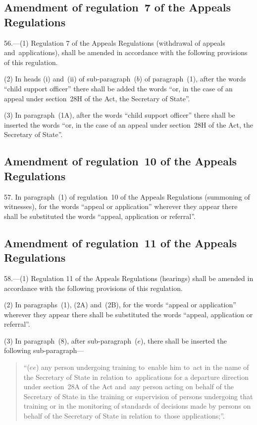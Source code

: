 \documentclass[12pt,a4paper]{article}
\begin{document}
\subsection[56. Amendment of regulation~7 of the Appeals Regulations]{Amendment of regulation~7 of the Appeals Regulations}

56.—(1) Regulation 7 of the
Appeals Regulations (withdrawal of appeals and~applications), shall be amended
in accordance with the following provisions of this regulation.

(2) In heads (i) and~(ii) of sub-paragraph~($b$) of paragraph~(1), after the words
“child support officer” there shall be added the words “or, in the case of an
appeal under section~28H of the Act, the Secretary of State”.

(3) In paragraph~(1A), after the words “child support officer” there shall be
inserted the words “or, in the case of an appeal under section~28H of the Act,
the Secretary of State”.

\subsection[57. Amendment of regulation~10 of the Appeals Regulations]{Amendment of regulation~10 of the Appeals Regulations}

57. In paragraph~(1) of
regulation~10 of the Appeals Regulations (summoning of witnesses), for the words
“appeal or application” wherever they appear there shall be substituted the
words “appeal, application or referral”.

\subsection[58. Amendment of regulation~11 of the Appeals Regulations]{Amendment of regulation~11 of the Appeals Regulations}

58.—(1) Regulation 11 of
the Appeals Regulations (hearings) shall be amended in accordance with the
following provisions of this regulation.

(2) In paragraphs~(1), (2A) and~(2B), for the words “appeal or application”
wherever they appear there shall be substituted the words “appeal, application
or referral”.

(3) In paragraph~(8), after sub-paragraph~($e$), there shall be inserted the
following sub-paragraph—
\begin{quotation}
“($ee$) any person undergoing training to~enable him to~act in the name of the
Secretary of State in relation to~applications for a departure direction under
section~28A of the Act and~any person acting on behalf of the Secretary of State
in the training or supervision of persons undergoing that training or in the
monitoring of standards of decisions made by persons on behalf of the Secretary
of State in relation to~those applications;”.
\end{quotation}
\end{document}
